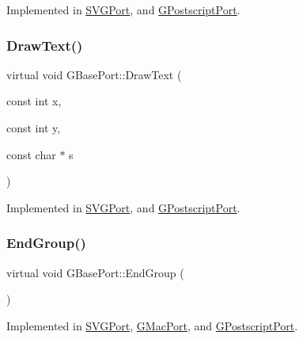 Implemented in \mbox{\hyperlink{class_s_v_g_port_a16219cfcb3520433a2c402c83b7ac47b}{S\+V\+G\+Port}}, and \mbox{\hyperlink{class_g_postscript_port_a2d69a564e11b54ee7d7878ad83b45707}{G\+Postscript\+Port}}.

\mbox{\label{class_g_base_port_a9b947d2575b05f303520fbbe7fd9e350}} 
\subsubsection{\texorpdfstring{Draw\+Text()}{DrawText()}}
{\footnotesize\ttfamily virtual void G\+Base\+Port\+::\+Draw\+Text (\begin{DoxyParamCaption}\item[{const int}]{x,  }\item[{const int}]{y,  }\item[{const char $\ast$}]{s }\end{DoxyParamCaption})\hspace{0.3cm}{\ttfamily [pure virtual]}}



Implemented in \mbox{\hyperlink{class_s_v_g_port_a94dc5a4fee82bacdd3160ea25827d7bb}{S\+V\+G\+Port}}, and \mbox{\hyperlink{class_g_postscript_port_abdd3978e13af04f5e6db9cf28cf861a8}{G\+Postscript\+Port}}.

\mbox{\label{class_g_base_port_aa5b444d85d6bf8c88bbddb58f7ce8bd4}} 
\subsubsection{\texorpdfstring{End\+Group()}{EndGroup()}}
{\footnotesize\ttfamily virtual void G\+Base\+Port\+::\+End\+Group (\begin{DoxyParamCaption}{ }\end{DoxyParamCaption})\hspace{0.3cm}{\ttfamily [pure virtual]}}



Implemented in \mbox{\hyperlink{class_s_v_g_port_a169f01fd03ef513e6d19df2ceb29234b}{S\+V\+G\+Port}}, \mbox{\hyperlink{class_g_mac_port_a0c29e4ce61f7c281f5cc9c04930db4fc}{G\+Mac\+Port}}, and \mbox{\hyperlink{class_g_postscript_port_a1b78acf751c5a4c04f5942bb8bf4ed67}{G\+Postscript\+Port}}.

